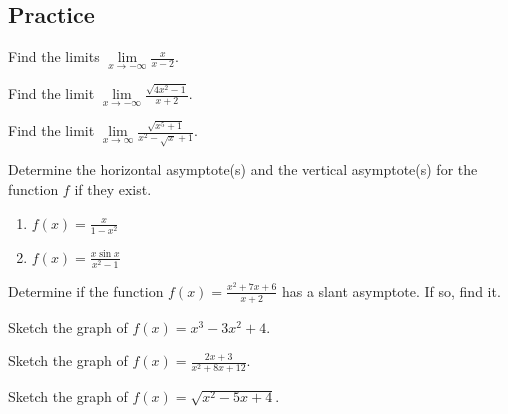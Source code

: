 \subsection{Practice}

\begin{exercise}

Find the limits \(\lim\limits_{x\to -\infty}\frac{x}{x - 2}\).

\end{exercise}
\vspace*{6\baselineskip}

\begin{exercise}

Find the limit \(\lim\limits_{x\to -\infty}\frac{\sqrt{4x^2 - 1}}{x+2}\).

\end{exercise}
\vspace*{6\baselineskip}

\begin{exercise}

Find the limit
\(\lim\limits_{x\to \infty}\frac{\sqrt{x^5+1}}{x^2 - \sqrt{x}+1}\).

\end{exercise}
\vspace*{6\baselineskip}

\begin{exercise}

Determine the horizontal asymptote(s) and the vertical asymptote(s) for
the function \(f\) if they exist.

\begin{enumerate}
\item
  \(f(x)=\frac{x}{1 - x^2}\)
\item
  \(f(x)=\frac{x\sin x}{x^2 - 1}\)
\end{enumerate}

\end{exercise}

\begin{exercise}

Determine if the function \(f(x)=\frac{x^2+7x+6}{x+2}\) has a slant
asymptote. If so, find it.

\end{exercise}
\vspace*{6\baselineskip}

\begin{exercise}

Sketch the graph of \(f(x)=x^3 - 3x^2+4\).

\end{exercise}
\vspace*{6\baselineskip}

\begin{exercise}

Sketch the graph of \(f(x)=\frac{2x+3}{x^{2}+8x+12}\).

\end{exercise}
\vspace*{6\baselineskip}

\begin{exercise}

Sketch the graph of \(f(x)=\sqrt{x^2 - 5x+4}\).

\end{exercise}

